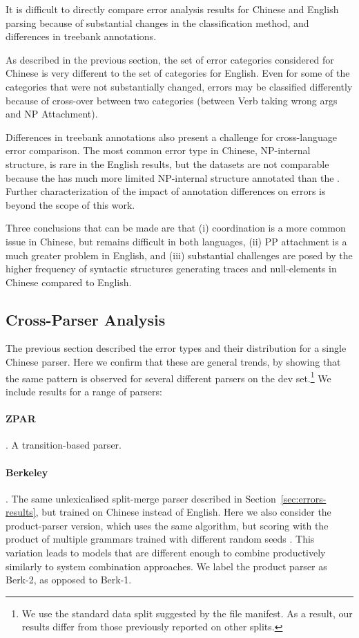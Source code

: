 It is difficult to directly compare error analysis results for Chinese and
English parsing because of substantial changes in the classification method,
and differences in treebank annotations.

As described in the previous section, the set of error categories considered for Chinese is very different to the set of categories for English.  
Even for some of the categories that were not substantially changed, errors may be classified differently because of cross-over between two categories (\myeg between Verb taking wrong args and NP Attachment).

Differences in treebank annotations also present a challenge for cross-language error comparison.
The most common error type in Chinese, NP-internal structure, is rare in the English results, but the datasets are not comparable because the \ptb has much more limited NP-internal structure annotated than the \pctb.
Further characterization of the impact of annotation differences on errors is beyond the scope of this work.

Three conclusions that can be made are that (i) coordination is a more common issue in Chinese, but remains difficult in
both languages, (ii) PP attachment is a much greater problem in English, and
(iii) substantial challenges are posed by the higher frequency of
syntactic structures generating traces and null-elements in Chinese compared to English.

\subsection{Cross-Parser Analysis} \label{sec:cross_parser_analysis}

The previous section described the error types and their distribution for a single Chinese parser.
Here we confirm that these are general trends, by showing that the same pattern
is observed for several different parsers on the  dev set.\footnote{
  We use the standard data split suggested by the  file manifest.
  As a result, our results differ from those previously reported on other splits.
}
We include results for a range of parsers:

\paragraph{ZPAR} \parencite{Zhang-Clark:2009:ICPT}.
A transition-based parser.

\paragraph{Berkeley} \parencite{Petrov-etal:2006,Petrov-Klein:2007}.
The same unlexicalised split-merge parser described in Section~\ref{sec:errors-results}, but trained on Chinese instead of English.
Here we also consider the product-parser version, which uses the same algorithm, but scoring with the product of multiple grammars trained with different random seeds \parencite{Petrov:2010:NAACLHLT}.
This variation leads to models that are different enough to combine productively similarly to system combination approaches.
We label the product parser as Berk-2, as opposed to Berk-1.


